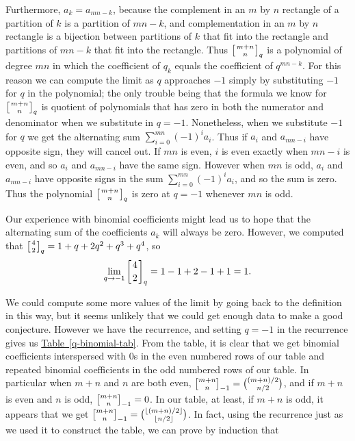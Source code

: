 \documentclass{book}
\begin{document}
\begin{activity}[]
\begin{enumerate}[font=\bfseries,label=(\alph*),ref=\alph*]
Furthermore, \(a_k=a_{mn-k}\), because the complement in an \(m\) by \(n\) rectangle of a partition of \(k\) is a partition of \(mn-k\), and complementation in an \(m\) by \(n\) rectangle is a bijection between partitions of \(k\) that fit into the rectangle and partitions of \(mn-k\) that fit into the rectangle. Thus \(\left[{m+n\atop n}\right]_q\) is a polynomial of degree \(mn\) in which the coefficient of \(q_k\) equals the coefficient of \(q^{mn-k}\). For this reason we can compute the limit as \(q\) approaches \(-1\) simply by substituting \(-1\) for \(q\) in the polynomial; the only trouble being that the formula we know for \(\left[{m+n\atop n}\right]_q\) is quotient of polynomials that has zero in both the numerator and denominator when we substitute in \(q=-1\). Nonetheless, when we substitute \(-1\) for \(q\) we get the alternating sum \(\sum_{i=0}^{mn} (-1)^ia_i\).  Thus if \(a_i\) and \(a_{mn-i}\) have opposite sign, they will cancel out. If \(mn\) is even, \(i\) is even exactly when \(mn-i\) is even, and so \(a_i\) and \(a_{mn-i}\) have the same sign. However when \(mn\) is odd, \(a_i\) and \(a_{mn-i}\) have opposite signs in the sum \(\sum_{i=0}^{mn} (-1)^ia_i\), and so the sum is zero.  Thus the polynomial \(\left[{m+n\atop n}\right]_q\) is zero at \(q=-1\) whenever \(mn\) is odd.%
\par
\hypertarget{p-1718}{}%
Our experience with binomial coefficients might lead us to hope that the alternating sum of the coefficients \(a_k\) will always be zero. However, we computed that \(\left[{4\atop2}\right]_q=1+q+2q^2+q^3+q^4\), so%
\begin{equation*}
\lim_{q\rightarrow -1}\left[{4\atop2}\right]_q=1-1+2-1+1=1.
\end{equation*}
%
\par
\hypertarget{p-1719}{}%
We could compute some more values of the limit by going back to the definition in this way, but it seems unlikely that we could get enough data to make a good conjecture. However we have the recurrence, and setting \(q=-1\) in the recurrence gives us \hyperref[q-binomial-tab]{Table~\ref{q-binomial-tab}}.  From the table, it is clear that we get binomial coefficients interspersed with 0s in the even numbered rows of our table and repeated binomial coefficients in the odd numbered rows of our table. In particular when \(m+n\) and \(n\) are both even, \(\negchoose{m+n}{n}=\binom{(m+n)/2}{n/2}\), and if \(m+n\) is even and \(n\) is odd, \(\negchoose{m+n}{n}=0\). In our table, at least, if \(m+n\) is odd, it appears that we get \(\negchoose{m+n}{n}=\binom{\lfloor(m+n)/2\rfloor}{\lfloor n/2\rfloor}\). In fact, using the recurrence just as we used it to construct the table, we can prove by induction that%

\end{enumerate}
\end{activity}
\end{document}
